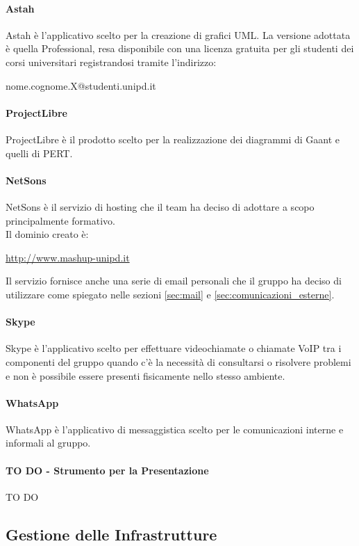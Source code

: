 			\paragraph{Astah}
			Astah è l'applicativo scelto per la creazione di grafici UML.
			La versione adottata è quella Professional, resa disponibile con una licenza gratuita per gli studenti dei corsi universitari registrandosi tramite l'indirizzo:
				\begin{center}
					nome.cognome.X@studenti.unipd.it
				\end{center}

			\paragraph{ProjectLibre}
			ProjectLibre è il prodotto scelto per la realizzazione dei diagrammi di Gaant e quelli di PERT.
			\paragraph{NetSons}
			NetSons è il servizio di hosting che il team ha deciso di adottare a scopo principalmente formativo. \\
			Il dominio creato è:
				\begin{center}
					\url{http://www.mashup-unipd.it}
				\end{center}
			Il servizio fornisce anche una serie di email personali che il gruppo ha deciso di utilizzare come spiegato nelle sezioni \ref{sec:mail} e \ref{sec:comunicazioni_esterne}.
			\paragraph{Skype}
			Skype è l'applicativo scelto per effettuare videochiamate o chiamate VoIP tra i componenti del gruppo quando c'è la necessità di consultarsi o risolvere problemi e non è possibile essere presenti fisicamente nello stesso ambiente.		
			\paragraph{WhatsApp}
			WhatsApp è l'applicativo di messaggistica scelto per le comunicazioni interne e informali al gruppo.
			\paragraph{TO DO - Strumento per la Presentazione}
			TO DO


	\subsection{Gestione delle Infrastrutture}
